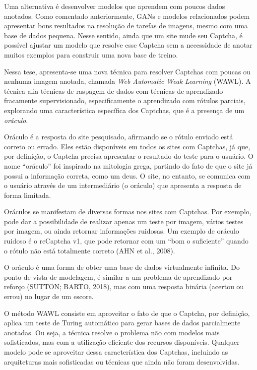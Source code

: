 \documentclass[12pt,twoside,brazilian]{book}
\begin{document}
Uma alternativa é desenvolver modelos que aprendem com poucos dados
anotados. Como comentado anteriormente, GANs e modelos relacionados
podem apresentar bons resultados na resolução de tarefas de imagens,
mesmo com uma base de dados pequena. Nesse sentido, ainda que um site
mude seu Captcha, é possível ajustar um modelo que resolve esse Captcha
sem a necessidade de anotar muitos exemplos para construir uma nova base
de treino.

Nessa tese, apresenta-se uma nova técnica para resolver Captchas com
poucas ou nenhuma imagem anotada, chamada \emph{Web Automatic Weak
Learning} (WAWL). A técnica alia técnicas de raspagem de dados com
técnicas de aprendizado fracamente supervisionado, especificamente o
aprendizado com rótulos parciais, explorando uma característica
específica dos Captchas, que é a presença de um \emph{oráculo}.

Oráculo é a resposta do site pesquisado, afirmando se o rótulo enviado
está correto ou errado. Eles estão disponíveis em todos os sites com
Captchas, já que, por definição, o Captcha precisa apresentar o
resultado do teste para o usuário. O nome ``oráculo'' foi inspirado na
mitologia grega, partindo do fato de que o site já possui a informação
correta, como um deus. O site, no entanto, se comunica com o usuário
através de um intermediário (o oráculo) que apresenta a resposta de
forma limitada.

Oráculos se manifestam de diversas formas nos sites com Captchas. Por
exemplo, pode dar a possibilidade de realizar apenas um teste por
imagem, vários testes por imagem, ou ainda retornar informações
ruidosas. Um exemplo de oráculo ruidoso é o reCaptcha v1, que pode
retornar com um ``bom o suficiente'' quando o rótulo não está totalmente
correto (AHN et al., 2008).

O oráculo é uma forma de obter uma base de dados virtualmente infinita.
Do ponto de vista de modelagem, é similar a um problema de aprendizado
por reforço (SUTTON; BARTO, 2018), mas com uma resposta binária (acertou
ou errou) no lugar de um escore.

O método WAWL consiste em aproveitar o fato de que o Captcha, por
definição, aplica um teste de Turing automático para gerar bases de
dados parcialmente anotadas. Ou seja, a técnica resolve o problema não
com modelos mais sofisticados, mas com a utilização eficiente dos
recursos disponíveis. Qualquer modelo pode se aproveitar dessa
característica dos Captchas, incluindo as arquiteturas mais sofisticadas
ou técnicas que ainda não foram desenvolvidas.
\end{document}
